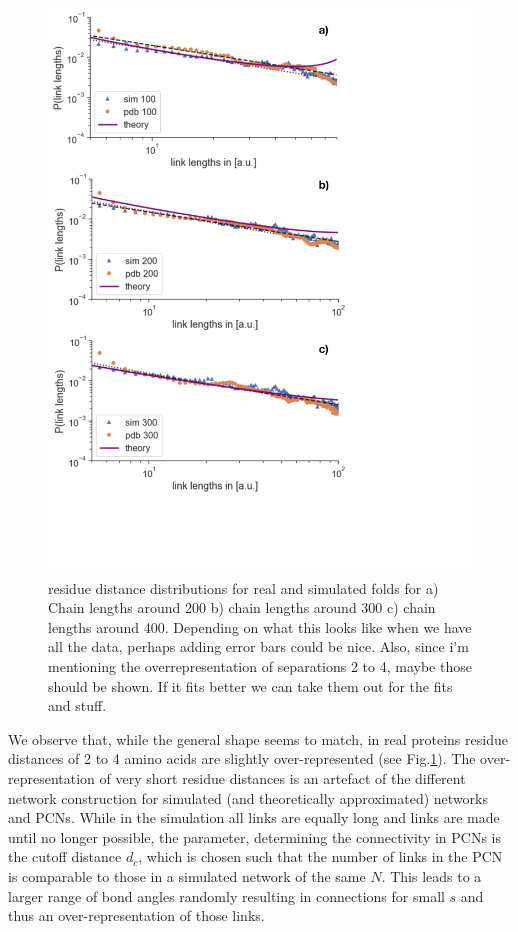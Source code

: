 \documentclass[
reprint,
twocolumn,
amsmath,amssymb,superscriptaddress,aps,
pre]{revtex4-1}
\newcommand{\red}[1]{\textcolor{red!80!black}{#1}}
\begin{document}
\begin{figure}[t]
        \centering
	\includegraphics[width=\columnwidth]{paper/figures/Fig3/Fig3.pdf}
        \caption{residue distance distributions for real and simulated folds for a) Chain lengths around 200 b) chain lengths around 300 c) chain lengths around 400. \red{Depending on what this looks like when we have all the data, perhaps adding error bars could be nice. Also, since i'm mentioning the overrepresentation of separations 2 to 4, maybe those should be shown. If it fits better we can take them out for the fits and stuff.}
        }
        \label{fig:sdd}
\end{figure}

We observe that, while the general shape seems to match, in real proteins residue distances of 2 to 4 amino acids are slightly over-represented (see Fig.\ref{fig:sdd}).
The over-representation of very short residue distances is an artefact of the different network construction for simulated (and theoretically approximated) networks and PCNs. While in the simulation all links are equally long and links are made until no longer possible, the parameter, determining the connectivity in PCNs is the cutoff distance $d_c$, which is chosen such that the number of links in the PCN is comparable to those in a simulated network of the same $N$. This leads to a larger range of bond angles randomly resulting in connections for small $s$ and thus an over-representation of those links.
\end{document}
